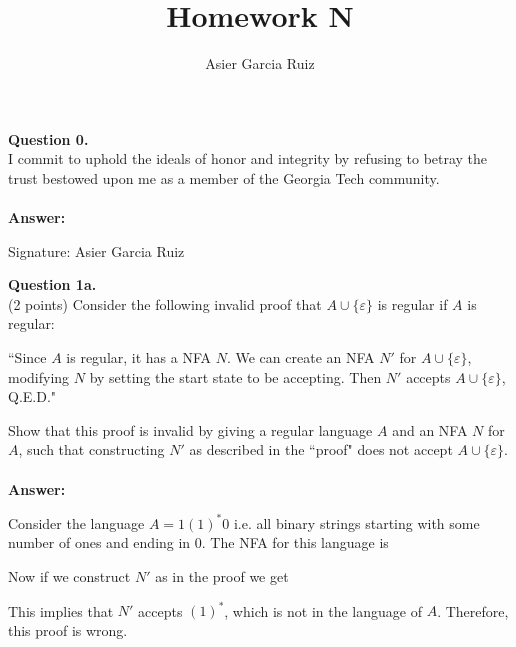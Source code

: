 \documentclass{article}
\title{Homework N}
\author{Asier Garcia Ruiz}
\renewcommand{\epsilon}{\varepsilon}
\begin{document}
\maketitle

\newenvironment{question}[2]
{
    {\large \textbf{Question #1.}}\\
    #2\\\\
    \textbf{Answer:}
}{\newpage}

\begin{question}{0}
    {
        I commit to uphold the ideals of honor and integrity by refusing to betray the trust bestowed upon me as a member of the Georgia Tech community.
    }
    Signature: Asier Garcia Ruiz
\end{question}

\begin{question}
    {1a}
    {
        (2 points) Consider the following invalid proof that $A \cup \{\epsilon\}$ is regular if $A$ is regular:

        ``Since $A$ is regular, it has a NFA $N$. We can create an NFA $N'$ for $A \cup \{\epsilon\}$, modifying $N$ by setting the start state to be accepting. Then $N'$ accepts $A \cup \{\epsilon\}$, Q.E.D."

        Show that this proof is invalid by giving a regular language $A$ and an NFA $N$ for $A$, such that constructing $N'$ as described in the ``proof" does not accept $A \cup \{\epsilon\}$.
    }
    Consider the language $A = 1(1)^*0$ i.e. all binary strings starting with some
    number of ones and ending in 0. The NFA for this language is


    Now if we construct $N'$ as in the proof we get


    This implies that $N'$ accepts $(1)^*$, which is not in the language of $A$.
    Therefore, this proof is wrong.
\end{question}
\end{document}
